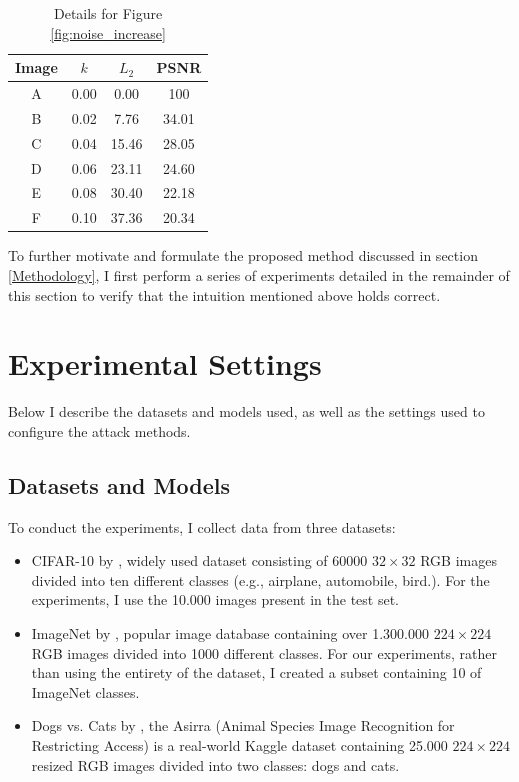 \begin{table}[h!]
    \centering
    \begin{tabular}{|c c c c|}
        \hline
        Image & $k$  & $L_{2}$ & PSNR  \\
        \hline
        A     & 0.00 & 0.00    & 100   \\
        B     & 0.02 & 7.76    & 34.01 \\
        C     & 0.04 & 15.46   & 28.05 \\
        D     & 0.06 & 23.11   & 24.60 \\
        E     & 0.08 & 30.40   & 22.18 \\
        F     & 0.10 & 37.36   & 20.34 \\
        \hline
    \end{tabular}
    \caption{Details for Figure \ref{fig:noise_increase}}
    \label{table:noise_increase}
\end{table}


To further motivate and formulate the proposed method discussed in section
\ref{Methodology}, I first perform a series of experiments detailed in the
remainder of this section to verify that the intuition mentioned above holds
correct.

\section{Experimental Settings}
Below I describe the datasets and models used, as well as the settings used to
configure the attack methods.

\subsection{Datasets and Models}
\label{sub:datasets_models}

To conduct the experiments, I collect data from three datasets:
\begin{itemize}
    \item CIFAR-10 by \cite{krizhevsky_learning_2009}, widely used dataset
          consisting of 60000 $32 \times 32$ RGB images divided into ten
          different classes (e.g., airplane, automobile, bird.). For the
          experiments, I use the 10.000 images present in the test set.
    \item ImageNet by \cite{russakovsky_imagenet_2015}, popular image database
          containing over 1.300.000 $224 \times 224$ RGB images divided into
          1000 different classes. For our experiments, rather than using the
          entirety of the dataset, I created a subset containing 10 of ImageNet
          classes.
    \item Dogs vs. Cats by \cite{elson_asirra_2007}, the Asirra (Animal Species
          Image Recognition for Restricting Access) is a real-world Kaggle
          dataset containing 25.000 $224 \times 224$ resized RGB images divided
          into two classes: dogs and cats.
\end{itemize}

